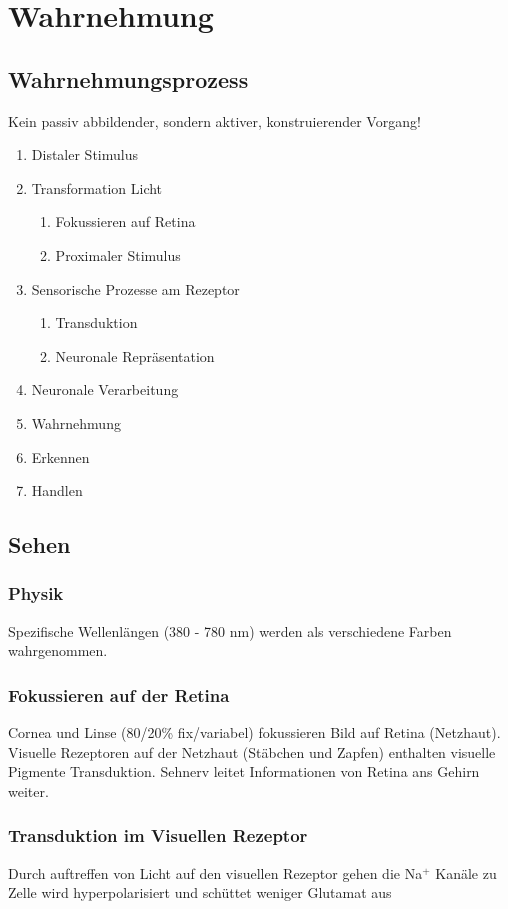 \section{Wahrnehmung}
\subsection{Wahrnehmungsprozess}
Kein passiv abbildender, sondern aktiver, konstruierender Vorgang!
\begin{enumerate}
	\item Distaler Stimulus
	\item Transformation Licht
		\begin{enumerate}
			\item Fokussieren auf Retina
			\item Proximaler Stimulus
		\end{enumerate}
	\item Sensorische Prozesse am Rezeptor
		\begin{enumerate}
			\item Transduktion
			\item Neuronale Repräsentation 
		\end{enumerate}
	\item Neuronale Verarbeitung
	\item Wahrnehmung
	\item Erkennen
	\item Handlen
\end{enumerate}
\subsection{Sehen}
\subsubsection{Physik}
Spezifische Wellenlängen (380 - 780 nm) werden als verschiedene Farben wahrgenommen.

\subsubsection{Fokussieren auf der Retina}
Cornea und Linse (80/20\% fix/variabel) fokussieren Bild auf Retina (Netzhaut). Visuelle Rezeptoren auf der Netzhaut (Stäbchen und Zapfen) enthalten visuelle Pigmente \rightarrow Transduktion. Sehnerv leitet Informationen von Retina ans Gehirn weiter.

\subsubsection{Transduktion im Visuellen Rezeptor}
Durch auftreffen von Licht auf den visuellen Rezeptor gehen die Na$^+$ Kanäle zu \Rightarrow Zelle wird hyperpolarisiert und schüttet weniger Glutamat aus

